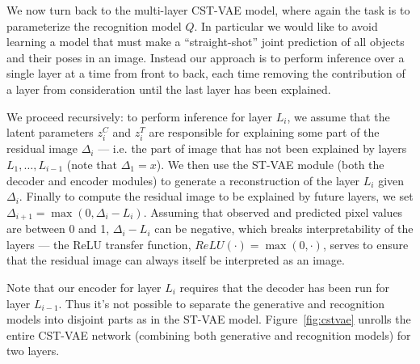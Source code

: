 
We now turn back to the multi-layer CST-VAE model, where again the task is to parameterize the recognition model $Q$. 
In particular we would like to 
avoid learning a model that must make a ``straight-shot'' joint prediction of all objects and their poses in an image.
Instead our approach is to perform inference over a single layer at a time from front to back, each time removing the contribution of a layer
from consideration until the last layer has been explained.


We proceed recursively: to perform inference for  layer $L_i$, we assume that the latent parameters $z^C_i$ and $z^T_i$ are responsible for explaining
some part of the residual image $\Delta_i$ --- i.e. the part of image that has not been explained by layers $L_1, \dots, L_{i-1}$ (note that $\Delta_1=x$).
We then use the ST-VAE module (both the decoder and encoder modules) 
to generate a reconstruction of the layer $L_i$ given $\Delta_i$.  Finally to compute the residual image to be explained by future layers, we set
$\Delta_{i+1} = \max (0, \Delta_i - L_i)$.  Assuming that observed and predicted pixel values are between 0 and 1, $\Delta_i-L_i$ can be negative, which breaks interpretability of the layers --- the ReLU transfer function, $ReLU(\cdot)=\max(0, \cdot)$, serves to ensure that the residual image can always itself be interpreted as an image.

Note that our encoder for layer $L_i$ requires that the decoder has been run for layer $L_{i-1}$.  Thus it's not possible to separate the generative
and recognition models into disjoint parts as in the ST-VAE model.  Figure~\ref{fig:cstvae} unrolls the entire CST-VAE network (combining
both generative and recognition models) for two layers.















